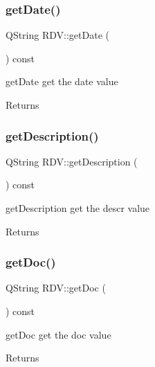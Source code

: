 \subsubsection{\texorpdfstring{getDate()}{getDate()}}
{\footnotesize\ttfamily Q\+String R\+D\+V\+::get\+Date (\begin{DoxyParamCaption}{ }\end{DoxyParamCaption}) const}



get\+Date get the date value 

\begin{DoxyReturn}{Returns}

\end{DoxyReturn}
\mbox{\label{class_r_d_v_aaa33b12beb34bc80e06a612e25ca604b}} 
\subsubsection{\texorpdfstring{getDescription()}{getDescription()}}
{\footnotesize\ttfamily Q\+String R\+D\+V\+::get\+Description (\begin{DoxyParamCaption}{ }\end{DoxyParamCaption}) const}



get\+Description get the descr value 

\begin{DoxyReturn}{Returns}

\end{DoxyReturn}
\mbox{\label{class_r_d_v_aab057819a02d3257b3f419a569c5e968}} 
\subsubsection{\texorpdfstring{getDoc()}{getDoc()}}
{\footnotesize\ttfamily Q\+String R\+D\+V\+::get\+Doc (\begin{DoxyParamCaption}{ }\end{DoxyParamCaption}) const}



get\+Doc get the doc value 

\begin{DoxyReturn}{Returns}

\end{DoxyReturn}
\mbox{\label{class_r_d_v_a3b764f633b3e46a8719313d40a177816}} 
